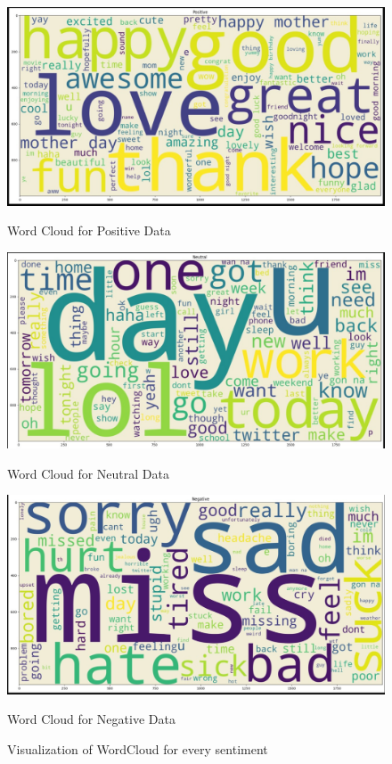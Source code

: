\documentclass[a4paper]{article}
\theoremstyle{plain}
\theoremstyle{definition}
\begin{document}
\begin{figure}[htbp]
    \centering
    \begin{minipage}[b]{0.3\textwidth}
        \centering
        \includegraphics[width=\textwidth]{figs/positive.jpg}
        \caption*{Word Cloud for Positive Data}
        \label{fig:figure3}
    \end{minipage}
    \hfill
    \begin{minipage}[b]{0.3\textwidth}
        \centering
        \includegraphics[width=\textwidth]{figs/nneutral.jpg}
        \caption*{Word Cloud for Neutral Data}
        \label{fig:figure4}
    \end{minipage}
    \hfill
    \begin{minipage}[b]{0.3\textwidth}
        \centering
        \includegraphics[width=\textwidth]{figs/neg.jpg}
        \caption*{Word Cloud for Negative Data}
        \label{fig:figure5}
    \end{minipage}
    \caption{Visualization of WordCloud for every sentiment}
    \label{fig:dataset_figures}
\end{figure}
\end{document}
